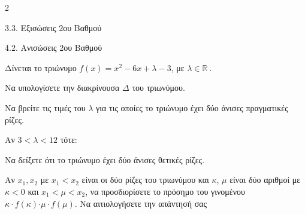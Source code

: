 \begin{ylh}{2}
    \item 3.3. Εξισώσεις 2ου Βαθμού
    \item 4.2. Ανισώσεις 2ου Βαθμού
\end{ylh}
Δίνεται το τριώνυμο $f(x) = x^{2} - 6x + \lambda - 3$, με $\lambda\mathbb{\in R\ .}$

\begin{alist}
\item Να υπολογίσετε την διακρίνουσα $\Delta$ του τριωνύμου.
\item Να βρείτε τις τιμές του $\lambda$ για τις οποίες το τριώνυμο έχει δύο άνισες πραγματικές ρίζες.
\item Αν $3 < \lambda < 12$ τότε:


\begin{rlist}
\item
  Να δείξετε ότι το τριώνυμο έχει δύο άνισες θετικές ρίζες.
\item
  Αν $x_{1},x_{2}$ με $x_{1} < x_{2}$ είναι οι δύο ρίζες του τριωνύμου και $\kappa$, $\mu$ είναι δύο αριθμοί με $\kappa < 0$ και $x_{1} < \mu < x_{2}$, να προσδιορίσετε το πρόσημο του γινομένου\\
  $\kappa \cdot f(\kappa)\text{⋅}\mu \cdot f(\mu)$. Να αιτιολογήσετε την απάντησή σας
\end{rlist}
\end{alist}

